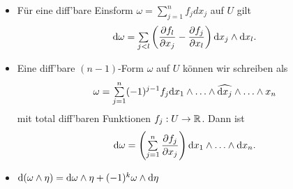 \documentclass{cheat-sheet}
\newcommand{\Cont}{\mathcal{C}} %
\theoremstyle{definition}
\let\myBinom\binom
\renewcommand{\binom}[2]{\mathsmaller{\myBinom{#1}{#2}}}
\begin{document}
\iffalse
\begin{bsp}
  Für $k = 1$: $\omega = \sum_{j = 1}^n f_j \d x_j$
  $\d \omega = \sum_{j=1}^n \d f_j \wedge \d x_j = \sum_{j=1}^n (\sum_{k=1}^n \frac{\partial f_j}{\partial x_k} \d x_k) \wedge \d x_j = \sum_{j=1}^k (\frac{\partial f_j}{\partial x_k} - \frac{\partial f_k}{\partial x_j}) \d x_k \wedge \d x_j$.

  $k = n -1$: $\mathrm{dim}(\Lambda^{n-1} V^*) = \binom{n}{n-1} = n = \mathrm{dim}(V)$
  $\Set{ (-1)^{j-1} \d x_1(u) \wedge \ldots \wedge \widehat{\d x_j(u)} \wedge \ldots \wedge \d x_n(u) }{ 1 \leq j \leq n }$ ist für alle $u \in U$ eine Basis von $\Lambda^{n-1} T_u^* U$.

  $\omega = \sum_{j=1}^n (-1)^{j-1} f_j \d x_1 \wedge \ldots \wedge \widehat{\d x_j} \wedge \ldots \wedge \d x_n$
  $\d \omega = \sum_{j=1}^n (-1)^{j-1} \d f_j \wedge \d x_1 \wedge \ldots \wedge \widehat{\d x_j} \wedge \ldots \wedge \d x_n = \begin{cases} 0, & \text{falls} j \not= k \\ \d x_1 \wedge \ldots \wedge \d x_n & j = k \end{cases}$
\end{bsp}
\fi

\begin{bem}
  \begin{itemize}
    \item Für eine diff'bare Einsform $\omega = \sum_{j=1}^n f_j dx_j$ auf $U$ gilt
    \[ \d \omega = \sum_{j<l} \left( \frac{\partial f_l}{\partial x_j} - \frac{\partial f_j}{\partial x_l} \right) \d x_j \wedge \d x_l. \]
    \item Eine diff'bare $(n{-}1)$-Form $\omega$ auf $U$ können wir schreiben als
    \[ \omega = \sum_{j=1}^n (-1)^{j-1} f_j \d x_1 \wedge \ldots \wedge \widehat{\d x_j} \wedge \ldots \wedge x_n \]
    mit total diff'baren Funktionen $f_j : U \to \mathbb{R}$. Dann ist
    \[ \d \omega = \left( \sum_{j=1}^n \frac{\partial f_j}{\partial x_j} \right) \d x_1 \wedge \ldots \wedge \d x_n. \]
  \end{itemize}
\end{bem}

\begin{satz}%
  \begin{itemize}
    \item $\mathrm{d} (\omega \wedge \eta) = \mathrm{d} \omega \wedge \eta + (-1)^k \omega \wedge \mathrm{d} \eta$
  \end{itemize}
\end{satz}
\end{document}

